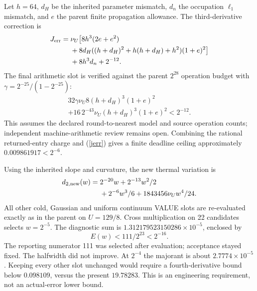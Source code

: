 \documentclass[a4paper,journal]{IEEEtran}
\begin{document}
Let $h=64$, $d_H$ be the inherited parameter mismatch, $d_n$ the occupation $\ell_1$ mismatch, and $e$ the parent finite propagation allowance. The third-derivative correction is
\begin{align}
J_{\rm err}={}&\nu_U\big[8h^3(2e+e^2)\nonumber\\&+8d_H((h+d_H)^2+h(h+d_H)+h^2)(1+e)^2\big]\nonumber\\&+8h^3d_n+2^{-12}.\label{jerr}
\end{align}
The final arithmetic slot is verified against the parent $2^{28}$ operation budget with $\gamma=2^{-25}/(1-2^{-25})$:
\begin{align}
32\gamma\nu_U8(h+d_H)^3(1+e)^2\nonumber\\+16\,2^{-43}\nu_U(h+d_H)^3(1+e)^2<2^{-12}.
\end{align}
This assumes the declared round-to-nearest model and source operation counts; independent machine-arithmetic review remains open. Combining the rational returned-entry charge and (\ref{jerr}) gives a finite deadline ceiling approximately $0.009861917<2^{-6}$.

Using the inherited slope and curvature, the new thermal variation is
\begin{align}d_{2,\rm new}(w)={}&2^{-20}w+2^{-13}w^2/2\nonumber\\&+2^{-6}w^3/6+1843456\nu_Uw^4/24.
\end{align}
All other cold, Gaussian and uniform continuum VALUE slots are re-evaluated exactly as in the parent on $U=129/8$. Cross multiplication on 22 candidates selects $w=2^{-5}$. The diagnostic sum is $1.312179523150286\times10^{-5}$, enclosed by
\begin{equation}E(w)<111/2^{23}<2^{-16}.
\end{equation}
The reporting numerator 111 was selected after evaluation; acceptance stayed fixed. The halfwidth did not improve. At $2^{-4}$ the majorant is about $2.7774\times10^{-5}$. Keeping every other slot unchanged would require a fourth-derivative bound below $0.098109$, versus the present $19.78283$. This is an engineering requirement, not an actual-error lower bound.
\end{document}
